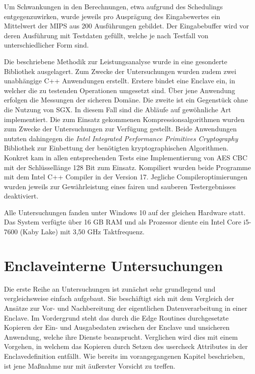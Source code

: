 Um Schwankungen in den Berechnungen, etwa aufgrund des Schedulings entgegenzuwirken, wurde jeweils pro Ausprägung des Eingabewertes ein Mittelwert der MIPS aus 200 Ausführungen gebildet. Der Eingabebuffer wird vor deren Ausführung mit Testdaten gefüllt, welche je nach Testfall von unterschiedlicher Form sind.

Die beschriebene Methodik zur Leistungsanalyse wurde in eine gesonderte Bibliothek ausgelagert. Zum Zwecke der Untersuchungen wurden zudem zwei unabhängige C++ Anwendungen erstellt. Erstere bindet eine Enclave ein, in welcher die zu testenden Operationen umgesetzt sind. Über jene Anwendung erfolgen die Messungen der sicheren Domäne. Die zweite ist ein Gegenstück ohne die Nutzung von SGX. In diesem Fall sind die Abläufe auf gewöhnliche Art implementiert. Die zum Einsatz gekommenen Kompressionsalgorithmen wurden zum Zwecke der Untersuchungen zur Verfügung gestellt. Beide Anwendungen nutzten dahingegen die \textit{Intel Integrated Performance Primitives Cryptography} Bibliothek zur Einbettung der benötigten kryptographischen Algorithmen. Konkret kam in allen entsprechenden Tests eine Implementierung von AES CBC mit der Schlüssellänge 128 Bit zum Einsatz. Kompiliert wurden beide Programme mit dem Intel C++ Compiler in der Version 17. Jegliche Compileroptimierungen wurden jeweils zur Gewährleistung eines fairen und sauberen Testergebnisses deaktiviert. 

Alle Untersuchungen fanden unter Windows 10 auf der gleichen Hardware statt. Das System verfügte über 16 GB RAM und als Prozessor diente ein Intel Core i5-7600 (Kaby Lake) mit 3,50 GHz Taktfrequenz.

\section{Enclaveinterne Untersuchungen}

Die erste Reihe an Untersuchungen ist zunächst sehr grundlegend und vergleichsweise einfach aufgebaut. Sie beschäftigt sich mit dem Vergleich der Ansätze zur Vor- und Nachbereitung der eigentlichen Datenverarbeitung in einer Enclave. Im Vordergrund steht das durch die Edge Routines durchgesetzte Kopieren der Ein- und Ausgabedaten zwischen der Enclave und unsicheren Anwendung, welche ihre Dienste beansprucht. Verglichen wird dies mit einem Vorgehen, in welchem das Kopieren durch Setzen des user\textunderscore check Attributes in der Enclavedefinition entfällt. Wie bereits im vorangegangenen Kapitel beschrieben, ist jene Maßnahme nur mit äußerster Vorsicht zu treffen.

